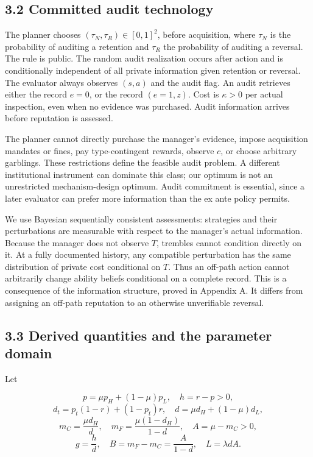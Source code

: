 \documentclass[
  11pt,
]{article}
\begin{document}
\subsection{3.2 Committed audit
technology}\label{committed-audit-technology}

The planner chooses \((\tau_N,\tau_R)\in[0,1]^2\), before acquisition,
where \(\tau_N\) is the probability of auditing a retention and
\(\tau_R\) the probability of auditing a reversal. The rule is public.
The random audit realization occurs after action and is conditionally
independent of all private information given retention or reversal. The
evaluator always observes \((s,a)\) and the audit flag. An audit
retrieves either the record \(e=0\), or the record \((e=1,z)\). Cost is
\(\kappa>0\) per actual inspection, even when no evidence was purchased.
Audit information arrives before reputation is assessed.

The planner cannot directly purchase the manager's evidence, impose
acquisition mandates or fines, pay type-contingent rewards, observe
\(c\), or choose arbitrary garblings. These restrictions define the
feasible audit problem. A different institutional instrument can
dominate this class; our optimum is not an unrestricted mechanism-design
optimum. Audit commitment is essential, since a later evaluator can
prefer more information than the ex ante policy permits.

We use Bayesian sequentially consistent assessments: strategies and
their perturbations are measurable with respect to the manager's actual
information. Because the manager does not observe \(T\), trembles cannot
condition directly on it. At a fully documented history, any compatible
perturbation has the same distribution of private cost conditional on
\(T\). Thus an off-path action cannot arbitrarily change ability beliefs
conditional on a complete record. This is a consequence of the
information structure, proved in Appendix A. It differs from assigning
an off-path reputation to an otherwise unverifiable reversal.

\subsection{3.3 Derived quantities and the parameter
domain}\label{derived-quantities-and-the-parameter-domain}

Let

\[p=\mu p_H+(1-\mu)p_L,\quad h=r-p>0,\]
\[d_t=p_t(1-r)+(1-p_t)r,\quad d=\mu d_H+(1-\mu)d_L,\]
\[m_C=\frac{\mu d_H}{d},\quad m_F=\frac{\mu(1-d_H)}{1-d},\quad A=\mu-m_C>0,\]
\[g=\frac{h}{d},\quad B=m_F-m_C=\frac{A}{1-d},\quad L=\lambda d A.\tag{2}\]
\end{document}
